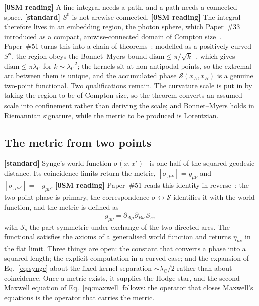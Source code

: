 \documentclass[%
 reprint, amsmath,amssymb, aps, prb, ]{revtex4-2}
\numberwithin{equation}{section}
\newcommand{\lambdaC}{\lambda_{\text{C}}}
\begin{document}
\textbf{[0SM reading]} A line integral needs a path, and a path needs a connected space. \textbf{[standard]} $S^{0}$ is not arcwise connected. \textbf{[0SM reading]} The integral therefore lives in an embedding region, the photon sphere, which Paper~\#33 introduced as a compact, arcwise-connected domain of Compton size~\cite{hanamura33}. Paper~\#51 turns this into a chain of theorems~\cite{hanamura51}: modelled as a positively curved $S^{n}$, the region obeys the Bonnet--Myers bound $\mathrm{diam}\le\pi/\sqrt{k}$~\cite{Myers1941}, which gives $\mathrm{diam}\le\pi\lambdaC$ for $k\sim\lambdaC^{-2}$; the kernels sit at non-antipodal points, so the extremal arc between them is unique, and the accumulated phase $\mathcal S(x_A,x_B)$ is a genuine two-point functional. Two qualifications remain. The curvature scale is put in by taking the region to be of Compton size, so the theorem converts an assumed scale into confinement rather than deriving the scale; and Bonnet--Myers holds in Riemannian signature, while the metric to be produced is Lorentzian.

\subsection{The metric from two points}

\textbf{[standard]} Synge's world function $\sigma(x,x')$~\cite{Synge1960} is one half of the squared geodesic distance. Its coincidence limits return the metric, $[\sigma_{;\mu\nu}] = g_{\mu\nu}$ and $[\sigma_{;\mu\nu'}] = -g_{\mu\nu}$. \textbf{[0SM reading]} Paper~\#51 reads this identity in reverse~\cite{hanamura51}: the two-point phase is primary, the correspondence $\sigma\leftrightarrow\mathcal S$ identifies it with the world function, and the metric is defined as
\begin{equation}
g_{\mu\nu} = \partial_{A\mu}\partial_{B\nu}\,\mathcal S_s ,
\label{eq:synge}
\end{equation}
with $\mathcal S_s$ the part symmetric under exchange of the two directed arcs. The functional satisfies the axioms of a generalised world function and returns $\eta_{\mu\nu}$ in the flat limit. Three things are open: the constant that converts a phase into a squared length; the explicit computation in a curved case; and the expansion of Eq.~\eqref{eq:synge} about the fixed kernel separation $\sim\lambdaC/2$ rather than about coincidence. Once a metric exists, it supplies the Hodge star, and the second Maxwell equation of Eq.~\eqref{eq:maxwell} follows: the operator that closes Maxwell's equations is the operator that carries the metric.
\end{document}
